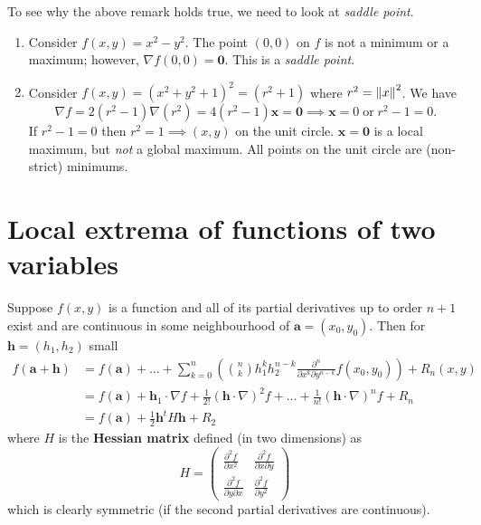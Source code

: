 
To see why the above remark holds true, we need to look at \emph{saddle point}.

\begin{example}
    \begin{enumerate}
        \item Consider $f(x, y) = x^2 - y^2$. The point $(0, 0)$ on $f$ is not a minimum or a maximum; however, $\nabla f(0,0) = \bm 0$. This is a \emph{saddle point}.
        \item Consider $f(x, y) = (x^2 + y^2 + 1)^2 = (r^2 + 1)$ where $r^2 = \left\lVert x\right\rVert^2$. We have
            \[ \nabla f = 2(r^2 - 1) \nabla (r^2) = 4(r^2 - 1) \bm x = \bm 0 \implies \bm x = 0 \;\text{or}\; r^2 - 1 = 0. \]
            If $r^2 - 1 = 0$ then $r^2 = 1 \implies (x, y)$ on the unit circle.
            $\bm x = \bm 0$ is a local maximum, but \emph{not} a global maximum. All points on the unit circle are (non-strict) minimums. 
    \end{enumerate}
\end{example}

\section{Local extrema of functions of two variables}

Suppose $f(x, y)$ is a function and all of its partial derivatives up to order $n + 1$ exist and are continuous in some neighbourhood of $\bm a = (x_0, y_0)$. Then for $\bm h = (h_1, h_2)$ small
\begin{align*}
    f(\bm a + \bm h) &= f(\bm a) + \ldots + \sum_{k = 0}^n \left( \binom nk h_1^k h_2^{n - k} \frac{\partial^n}{\partial x^k \partial y^{n - k}} f(x_0, y_0) \right) + R_n(x, y) \\
    &= f(\bm a) + \bm h_1 \cdot \nabla f + \frac{1}{2!} (\bm h \cdot \nabla)^2 f + \ldots + \frac1{n!} (\bm h \cdot \nabla)^nf + R_n \\
    &= f(\bm a) + \frac12 \bm h^t H \bm h + R_2
\end{align*}
where $H$ is the \textbf{Hessian matrix} defined (in two dimensions) as
\[ H = \begin{pmatrix} \frac{\partial^2 f}{\partial x^2} & \frac{\partial^2 f}{\partial x\partial y} \\ \frac{\partial^2 f}{\partial y \partial x} & \frac{\partial^2 f}{\partial y^2} \end{pmatrix} \]
which is clearly symmetric (if the second partial derivatives are continuous).

